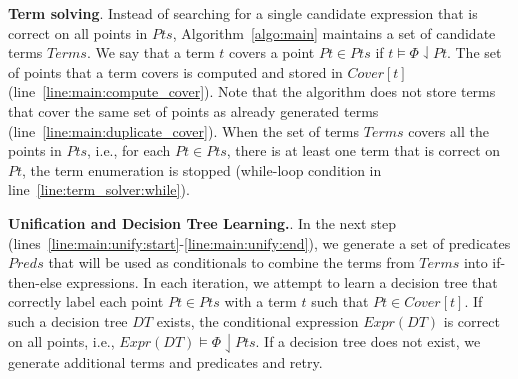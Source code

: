 \documentclass{llncs}
\newcommand\Points{\mathit{Pts}}
\newcommand\Point{\mathit{Pt}}
\newcommand\Predicates{\mathit{Preds}}
\newcommand\Terms{\mathit{Terms}}
\newcommand\Term{t}
\newcommand\Cover{\mathit{Cover}}
\newcommand\Spec{\Phi}
\newcommand\DecisionTree{\mathit{DT}}
\newcommand\DTtoExpr[1]{\mathit{Expr}(#1)}
\renewcommand{\paragraph}[1]{\par\noindent\textbf{#1}.}
\begin{document}
\paragraph{Term solving}
Instead of searching for a single candidate expression that is correct
on all points in $\Points$, Algorithm~\ref{algo:main} maintains a set of
candidate terms $\Terms$.
We say that a term $\Term$ covers a point $\Point \in \Points$ if $\Term
\models \Spec \downharpoonleft \Point$.
The set of points that a term covers is computed and stored in
$\Cover[\Term]$ (line~\ref{line:main:compute_cover}).
Note that the algorithm does not store terms that cover the same set of
points as already generated terms
(line~\ref{line:main:duplicate_cover}).
When the set of terms $\Terms$ covers all the points in $\Points$, i.e., for
each $\Point \in \Points$, there is at least one term that is correct on
$\Point$, the term enumeration is stopped (while-loop condition in
line~\ref{line:term_solver:while}).

\paragraph{Unification and Decision Tree Learning.}
In the next step
(lines~\ref{line:main:unify:start}-\ref{line:main:unify:end}), we
generate a set of predicates $\Predicates$ that will be used as
conditionals to combine the terms from $\Terms$ into if-then-else
expressions.
In each iteration, we attempt to learn a decision tree that correctly
label each point $\Point \in \Points$ with a term $\Term$ such that
$\Point \in \Cover[\Term]$.
If such a decision tree $\DecisionTree$ exists, the conditional
expression $\DTtoExpr{\DecisionTree}$ is correct on all points, i.e.,
$\DTtoExpr{\DecisionTree} \models \Spec \downharpoonleft \Points$.
If a decision tree does not exist, we generate additional terms and
predicates and retry.
\end{document}
